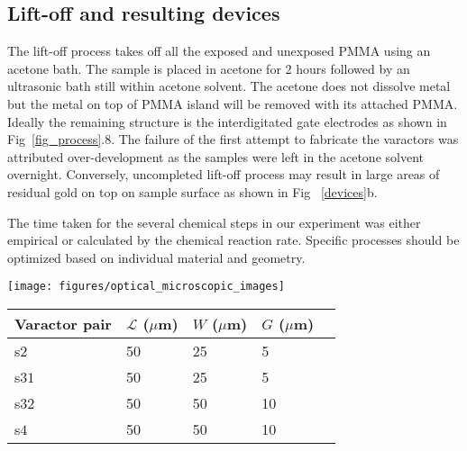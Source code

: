 \documentclass[10pt,a4paper,twoside]{article}
\begin{document}
\begin{multicols}{2}
\subsection{Lift-off and resulting devices}
The lift-off process takes off all the exposed and unexposed PMMA using an acetone bath. The sample is placed in acetone for 2 hours followed by an ultrasonic bath still within acetone solvent. The acetone does not dissolve metal but the metal on top of PMMA island will be removed with its attached PMMA. Ideally the remaining structure is the interdigitated gate electrodes as shown in Fig~\ref{fig_process}.8. The failure of the first attempt to fabricate the varactors was attributed over-development as the samples were left in the acetone solvent overnight. Conversely, uncompleted lift-off process may result in large areas of residual gold on top on sample surface as shown in Fig ~\ref{devices}b.
\par
The time taken for the several chemical steps in our experiment was either empirical or calculated by the chemical reaction rate. Specific processes should be optimized based on individual material and geometry. 
\begin{Figure}   
    \centering    
    \texttt{[image: figures/optical\_microscopic\_images]}    
    \label{fig_optical_microscopic_images}
\end{Figure}
\vspace{1em}
\begin{minipage}[c]{0.45\textwidth}
\label{tab_device_geometries}
\begin{center}
    \begin{tabular}{* {5}{l}} %
     \toprule
      Varactor pair & $\mathcal{L}$ ($\mu$m)  & $W$ ($\mu$m) & $G$ ($\mu$m) 
      \\
      \midrule
      s$2$ & 50 & 25 & 5 
      \\
      s$31$ & 50 & 25 & 5 
      \\
      s$32$ & 50 & 50 & 10 
      \\
      s$4$ & 50 & 50 & 10 
      \\
      \bottomrule
    \end{tabular}
  \end{center}
\end{minipage}

\end{multicols}
\end{document}
